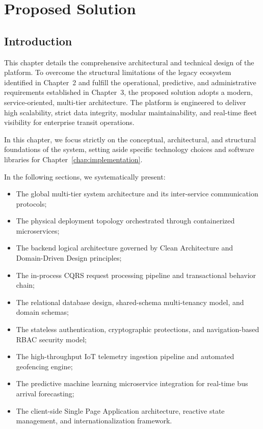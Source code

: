 \chapter{Proposed Solution}
\label{chap:proposed_solution}

\section{Introduction}
\label{sec:solution_intro}

This chapter details the comprehensive architectural and technical design of the  platform. To overcome the structural limitations of the legacy ecosystem identified in Chapter~2 and fulfill the operational, predictive, and administrative requirements established in Chapter~3, the proposed solution adopts a modern, service-oriented, multi-tier architecture. The platform is engineered to deliver high scalability, strict data integrity, modular maintainability, and real-time fleet visibility for enterprise transit operations.

In this chapter, we focus strictly on the conceptual, architectural, and structural foundations of the system, setting aside specific technology choices and software libraries for Chapter~\ref{chap:implementation}.

In the following sections, we systematically present:
\begin{itemize}
  \item The global multi-tier system architecture and its inter-service communication protocols;
  \item The physical deployment topology orchestrated through containerized microservices;
  \item The backend logical architecture governed by Clean Architecture and Domain-Driven Design principles;
  \item The in-process CQRS request processing pipeline and transactional behavior chain;
  \item The relational database design, shared-schema multi-tenancy model, and domain schemas;
  \item The stateless authentication, cryptographic protections, and navigation-based RBAC security model;
  \item The high-throughput IoT telemetry ingestion pipeline and automated geofencing engine;
  \item The predictive machine learning microservice integration for real-time bus arrival forecasting;
  \item The client-side Single Page Application architecture, reactive state management, and internationalization framework.
\end{itemize}

